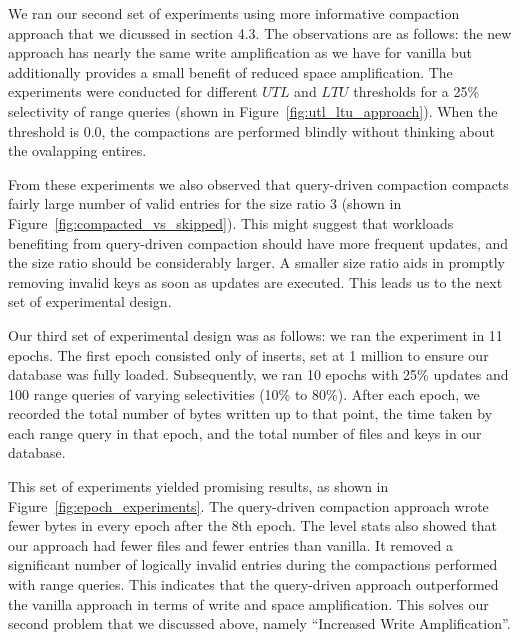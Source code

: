 We ran our second set of experiments using more informative compaction approach that we dicussed in section 4.3. The 
observations are as follows: the new approach has nearly the same write amplification as we have for vanilla but 
additionally provides a small benefit of reduced space amplification. The experiments were conducted for different $UTL$ and $LTU$ 
thresholds for a 25\% selectivity of range queries (shown in Figure~\ref{fig:utl_ltu_approach}). When the threshold is 
$0.0$, the compactions are performed blindly without thinking about the ovalapping entires.


From these experiments we also observed that query-driven compaction compacts fairly large number of valid entries for the size ratio 3 (shown 
in Figure~\ref{fig:compacted_vs_skipped}). This might suggest that workloads benefiting from query-driven compaction 
should have more frequent updates, and the size ratio should be considerably larger. A smaller size ratio aids in 
promptly removing invalid keys as soon as updates are executed. This leads us to the next set of experimental design.

Our third set of experimental design was as follows: we ran the experiment in 11 epochs. The first epoch consisted only 
of inserts, set at 1 million to ensure our database was fully loaded. Subsequently, we ran 10 epochs with 25\% updates 
and 100 range queries of varying selectivities (10\% to 80\%). After each epoch, we recorded the total number of bytes 
written up to that point, the time taken by each range query in that epoch, and the total number of files and keys in 
our database. 

This set of experiments yielded promising results, as shown in Figure~\ref{fig:epoch_experiments}. The query-driven 
compaction approach wrote fewer bytes in every epoch after the 8th epoch. The level stats also showed that our approach 
had fewer files and fewer entries than vanilla. It removed a significant number of logically invalid entries during the 
compactions performed with range queries. This indicates that the query-driven approach outperformed the vanilla 
approach in terms of write and space amplification. This solves our second problem that we discussed above, namely 
``Increased Write Amplification''. 


